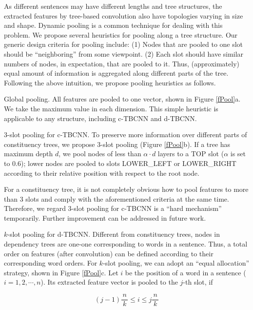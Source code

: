\documentclass[11pt,a4paper]{article}
\begin{document}
As different sentences may have different lengths and tree structures,
the extracted features by tree-based convolution also have topologies varying in size and shape.
Dynamic pooling \cite{dynamic} is a common technique for dealing with this problem.
We propose several heuristics for pooling along a tree structure.
Our generic design criteria for pooling include: (1) Nodes that are pooled to one slot should be ``neighboring'' from some viewpoint. (2) Each slot should have similar numbers of nodes, in expectation, that are pooled to it.
Thus, (approximately) equal amount of information is aggregated
along different parts of the tree. 
Following the above intuition, we propose pooling heuristics as follows.

\begin{compactitem}
\item Global pooling. All features are pooled to one vector, shown in Figure \ref{fPool}a.
We take
the maximum value in each dimension. This simple heuristic is applicable to
any structure, including c-TBCNN and d-TBCNN.

\item $3$-slot pooling for c-TBCNN. To preserve more information over different parts of
constituency trees, we propose 3-slot pooling (Figure \ref{fPool}b).
If a tree has maximum depth $d$,
we pool nodes of less than $\alpha\cdot d$ layers to a TOP slot ($\alpha$ is set to 0.6); lower nodes are pooled to slots LOWER\_LEFT
or LOWER\_RIGHT according to their relative position with respect to the root node.

For a constituency tree,
it is not completely obvious how to pool
features to more than 3 slots
and comply with the aforementioned criteria at the same time.
Therefore, we regard 3-slot pooling for c-TBCNN is a ``hard mechanism''
temporarily. Further improvement can be addressed in future work.


\item $k$-slot pooling for d-TBCNN. Different from constituency trees,
nodes in dependency trees are one-one corresponding to
words in a sentence.
Thus, a total order on features (after convolution) can be defined according to
their corresponding word orders.
For $k$-slot pooling,
we can adopt an ``equal allocation'' strategy, shown in Figure \ref{fPool}c.
Let $i$ be the position of a word in a sentence ($i= 1, 2, \cdots, n$).
Its extracted feature vector is pooled to the $j$-th slot, if

\vspace{-.3cm}

$$(j-1)\dfrac{\,n\,}k \le i \le j\dfrac{\, n\,}k$$
\end{compactitem}
\end{document}
